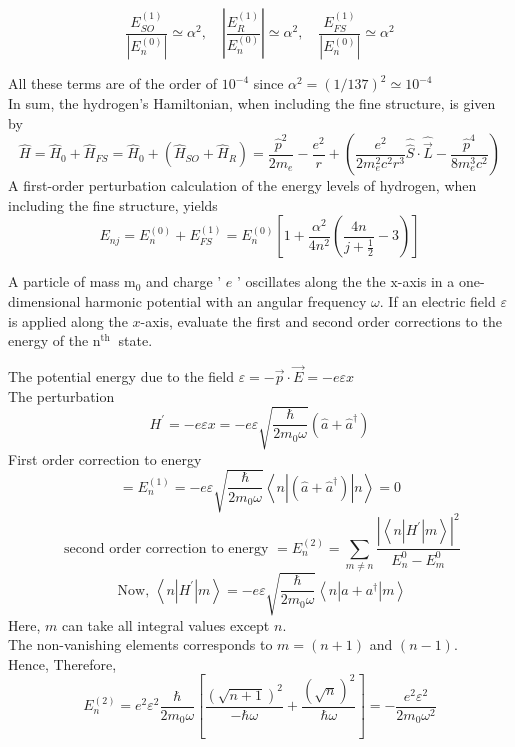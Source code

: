 $$\frac{E_{S O}^{(1)}}{\left|E_{n}^{(0)}\right|} \simeq \alpha^{2}, \quad\left|\frac{E_{R}^{(1)}}{E_{n}^{(0)}}\right| \simeq \alpha^{2}, \quad \frac{E_{F S}^{(1)}}{\left|E_{n}^{(0)}\right|} \simeq \alpha^{2}$$

All these terms are of the order of $10^{-4}$ since $\alpha^{2}=(1 / 137)^{2} \simeq 10^{-4}$\\
In sum, the hydrogen's Hamiltonian, when including the fine structure, is given by
$$\hat{H}=\hat{H}_{0}+\hat{H}_{F S}=\hat{H}_{0}+\left(\hat{H}_{S O}+\hat{H}_{R}\right)=\frac{\hat{p}^{2}}{2 m_{e}}-\frac{e^{2}}{r}+\left(\frac{e^{2}}{2 m_{e}^{2} c^{2} r^{3}} \hat{\hat{S}} \cdot \hat{\vec{L}}-\frac{\hat{p}^{4}}{8 m_{e}^{3} c^{2}}\right)$$
A first-order perturbation calculation of the energy levels of hydrogen, when including the fine structure, yields
$$
E_{n j}=E_{n}^{(0)}+E_{F S}^{(1)}=E_{n}^{(0)}\left[1+\frac{\alpha^{2}}{4 n^{2}}\left(\frac{4 n}{j+\frac{1}{2}}-3\right)\right]
$$
\begin{exercise}
 A particle of mass $\mathrm{m}_{0}$ and charge ' $e$ ' oscillates along the the $\mathrm{x}$-axis in a one-dimensional harmonic potential with an angular frequency $\omega$. If an electric field $\varepsilon$ is applied along the $x$-axis, evaluate the first and second order corrections to the energy of the $\mathrm{n}^{\text {th }}$ state.
\end{exercise}
\begin{answer}
The potential energy due to the field $\varepsilon=-\vec{p} \cdot \vec{E}=-e \varepsilon x$\\
The perturbation $$H^{\prime}=-e \varepsilon x=-e \varepsilon \sqrt{\frac{\hbar}{2 m_{0} \omega}}\left(\hat{a}+\hat{a}^{\dagger}\right)$$
First order correction to energy $$=E_{n}^{(1)}=-e \varepsilon \sqrt{\frac{\hbar}{2 m_{0} \omega}}\left\langle n\left|\left(\hat{a}+\hat{a}^{\dagger}\right)\right| n\right\rangle=0$$
$$\text { second order correction to energy }=E_{n}^{(2)}=\sum_{m \neq n} \frac{\left|\left\langle n\left|H^{\prime}\right| m\right\rangle\right|^{2}}{E_{n}^{0}-E_{m}^{0}}$$
$$\text { Now, }\left\langle n\left|H^{\prime}\right| m\right\rangle=-e \varepsilon \sqrt{\frac{\hbar}{2 m_{0} \omega}}\left\langle n\left|a+a^{\dagger}\right| m\right\rangle$$
Here, $m$ can take all integral values except $n$.\\
 The non-vanishing elements corresponds to $m=(n+1)$ and $(n-1)$.\\
 Hence,
Therefore, $$E_{n}^{(2)}=e^{2} \varepsilon^{2} \frac{\hbar}{2 m_{0} \omega}\left[\frac{(\sqrt{n+1})^{2}}{-\hbar \omega}+\frac{(\sqrt{n})^{2}}{\hbar \omega}\right]=-\frac{e^{2} \varepsilon^{2}}{2 m_{0} \omega^{2}}$$	
\end{answer}
